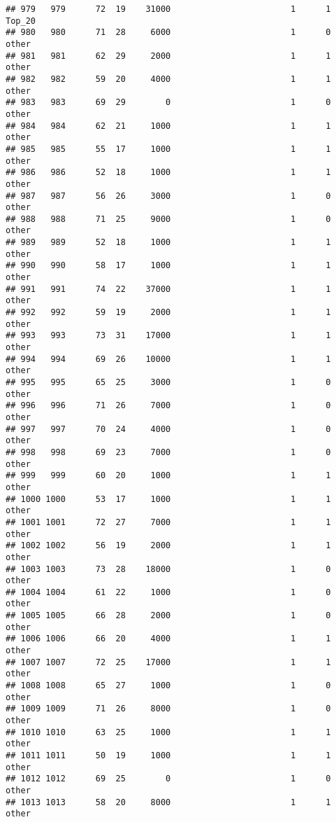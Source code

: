\documentclass[
]{article}
\begin{document}
\begin{verbatim}
## 979   979      72  19    31000                        1      1   Top_20
## 980   980      71  28     6000                        1      0    other
## 981   981      62  29     2000                        1      1    other
## 982   982      59  20     4000                        1      1    other
## 983   983      69  29        0                        1      0    other
## 984   984      62  21     1000                        1      1    other
## 985   985      55  17     1000                        1      1    other
## 986   986      52  18     1000                        1      1    other
## 987   987      56  26     3000                        1      0    other
## 988   988      71  25     9000                        1      0    other
## 989   989      52  18     1000                        1      1    other
## 990   990      58  17     1000                        1      1    other
## 991   991      74  22    37000                        1      1    other
## 992   992      59  19     2000                        1      1    other
## 993   993      73  31    17000                        1      1    other
## 994   994      69  26    10000                        1      1    other
## 995   995      65  25     3000                        1      0    other
## 996   996      71  26     7000                        1      0    other
## 997   997      70  24     4000                        1      0    other
## 998   998      69  23     7000                        1      0    other
## 999   999      60  20     1000                        1      1    other
## 1000 1000      53  17     1000                        1      1    other
## 1001 1001      72  27     7000                        1      1    other
## 1002 1002      56  19     2000                        1      1    other
## 1003 1003      73  28    18000                        1      0    other
## 1004 1004      61  22     1000                        1      0    other
## 1005 1005      66  28     2000                        1      0    other
## 1006 1006      66  20     4000                        1      1    other
## 1007 1007      72  25    17000                        1      1    other
## 1008 1008      65  27     1000                        1      0    other
## 1009 1009      71  26     8000                        1      0    other
## 1010 1010      63  25     1000                        1      1    other
## 1011 1011      50  19     1000                        1      1    other
## 1012 1012      69  25        0                        1      0    other
## 1013 1013      58  20     8000                        1      1    other

\end{verbatim}
\end{document}
